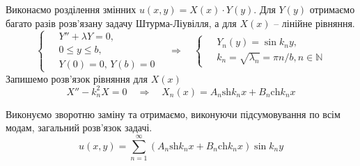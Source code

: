 Виконаємо розділення змінних $u(x,y) = X(x)\cdot Y(y)$. Для $Y(y)$ отримаємо багато разів розв'язану задачу Штурма-Ліувілля, а для $X(x)$ -- лінійне рівняння.
\begin{equation} 
    \left\{ \begin{aligned}
        \;&Y'' + \lambda Y = 0, \\ 
          &0 \leq y \leq b, \\
          &Y(0) = 0,\, Y(b) = 0 
    \end{aligned} \right.
    \quad\Rightarrow\quad
    \left\{ \begin{aligned}
        \;& Y_n(y) = \sin k_ny, \\
          & k_n = \sqrt{\lambda_n} = \pi n/b, n \in \mathbb{N} 
    \end{aligned} \right.
\end{equation}
Запишемо розв'язок рівняння для $X(x)$
\begin{equation}
    X'' - k_n^2 X = 0
    \quad\Rightarrow\quad
    X_n(x) = A_n\mathrm{sh}k_nx + B_n\mathrm{ch}k_nx
\end{equation}

Виконуємо зворотню заміну та отримаємо, виконуючи підсумовування по всім модам, загальний розв'язок задачі.
\begin{equation}
    u(x,y) = \sum_{n=1}^{\infty} \left(A_n\mathrm{sh}k_nx + B_n\mathrm{ch}k_nx\right) \sin k_ny
\end{equation}

